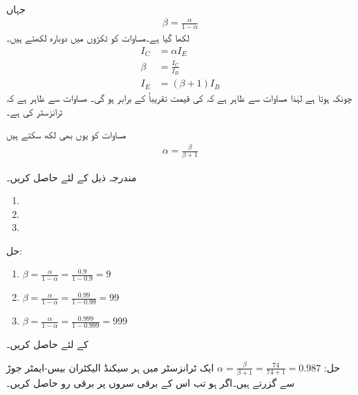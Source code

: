 جہاں
\begin{align} \label{مساوات_ٹرانزسٹر_افزائش_رو}
\beta = \frac{\alpha}{1-\alpha}
\end{align}
لکھا گیا ہے۔مساوات   کو ٹکڑوں میں دوبارہ لکھتے ہیں۔
\begin{align} 
I_C &=\alpha I_E  \label{مساوات_ٹرانزسٹر_کلکٹر _اور_مخارج_رو_برابر}\\
\beta&=\frac{I_C}{I_B} \label{مساوات_ٹرانزسٹر_افزائش}\\
I_E&=(\beta +1) I_B \label{مساوات_ٹرانزسٹر_مخارج_اور_قابو_رو}
\end{align}
چونکہ   ہوتا ہے لہٰذا مساوات   سے ظاہر ہے کہ   کی قیمت تقریباً   کے برابر ہو گی۔ مساوات   سے ظاہر ہے کہ  ٹرانزسٹر کی   ہے۔

	مساوات   کو یوں بھی لکھ سکتے ہیں
\begin{align} \label{مساوات_ٹرانزسٹر_بیٹا_سے_الفا} 
\alpha = \frac{\beta }{\beta +1}
\end{align}

 
مندرجہ ذیل کے لئے   حاصل کریں۔
\begin{enumerate}
\item
{}
\item
{}
\item
{}
\end{enumerate}
حل:
\begin{enumerate}
\item
$\beta = \frac{\alpha}{1-\alpha}=\frac{0.9}{1-0.9}=\num{9} $
\item
$\beta = \frac{\alpha}{1-\alpha}=\frac{0.99}{1-0.99}=\num{99} $
\item
$\beta = \frac{\alpha}{1-\alpha}=\frac{0.999}{1-0.999}=\num{999}$
\end{enumerate}


 کے لئے  حاصل کریں۔

حل:
$\alpha=\frac{\beta}{\beta+1} =\frac{74}{74+1}=\num{0.987}$
ایک ٹرانزسٹر میں ہر سیکنڈ   الیکٹران بیس-ایمٹر  جوڑ سے گزرتے ہیں۔اگر   ہو تب اس کے برقی سروں پر برقی رو حاصل کریں۔

